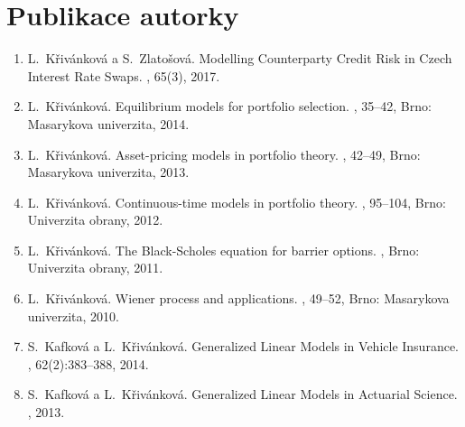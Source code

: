 \documentclass[a4paper,12pt]{report}
\theoremstyle{definition} \newtheorem{definice}[veta]{Definice}
\theoremstyle{remark}
\begin{document}
\section*{Publikace autorky}
%
%
\begin{enumerate}
\renewcommand\labelenumi{\Roman{enumi}.}
\item
L.~Křivánková a S.~Zlatošová.
\newblock Modelling Counterparty Credit Risk in Czech Interest Rate Swaps.
, 65(3), 2017.

\item
L.~Křivánková.
\newblock Equilibrium models for portfolio selection.
, 35--42, Brno: Masarykova univerzita, 2014.

\item
L.~Křivánková.
\newblock Asset-pricing models in portfolio theory.
, 42--49, Brno: Masarykova univerzita, 2013.

\item
L.~Křivánková.
\newblock Continuous-time models in portfolio theory.
, 95--104, Brno: Univerzita obrany, 2012.
\item
L.~Křivánková.
\newblock The Black-Scholes equation for barrier options.
, Brno: Univerzita obrany, 2011.

\item
L.~Křivánková.
\newblock Wiener process and applications.
, 49--52, Brno: Masarykova univerzita, 2010.

\item
S.~Kafková a L.~Křivánková.
\newblock Generalized Linear Models in Vehicle Insurance.
, 62(2):383--388, 2014.

\item
S.~Kafková a L.~Křivánková.
\newblock Generalized Linear Models in Actuarial Science. 
, 
2013.


\end{enumerate}
\end{document}
